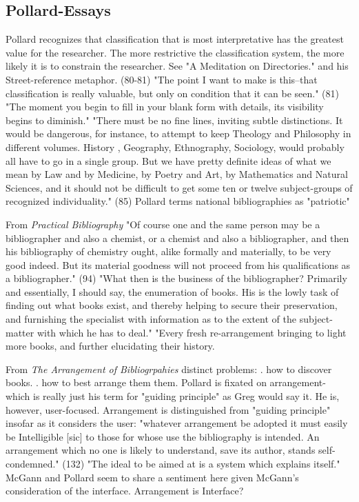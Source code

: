 \documentclass[course, english]{Notes}
\newcommand{\n}{\scalebox{2}{\textbf{\framebox{$\aleph$} } } }
\begin{document}
\subsection{Pollard-Essays}
\begin{outline}
\1 \n Pollard recognizes that classification that is most interpretative has the greatest value for the researcher. The more restrictive the classification system, the more likely it is to constrain the researcher. 
	\2 See "A Meditation on Directories." and his Street-reference metaphor. (80-81)
	\2 "The point I want to make is this--that classification is really valuable, but only on condition that it can be seen." (81)
			\3 "The moment you begin to fill in your blank form with details, its visibility begins to diminish." 
	\2 "There must be no fine lines, inviting subtle distinctions. It would be dangerous, for instance, to attempt to keep Theology and Philosophy in different volumes. History , Geography, Ethnography, Sociology, would probably all have to go in a single group. But we have pretty definite ideas of what we mean by Law and by Medicine, by Poetry and Art, by Mathematics and Natural Sciences, and it should not be difficult to get some ten or twelve subject-groups of recognized individuality." (85)
		\3 Pollard terms national bibliographies as "patriotic"
	
\1 From \textit{Practical Bibliography}
	\2 "Of course one and the same person may be a bibliographer and also a chemist, or a chemist and also a bibliographer, and then his bibliography of chemistry ought, alike formally and materially, to be very good indeed. But its material goodness will not proceed from his qualifications as a bibliographer." (94)
	\2 "What then is the business of the bibliographer? Primarily and essentially, I should say, the enumeration of books. His is the lowly task of finding out what books exist, and thereby helping to secure their preservation, and furnishing the specialist with information as to the extent of the subject-matter with which he has to deal."
		"Every fresh re-arrangement bringing to light more books, and further elucidating their history. 

\1 From \textit{The Arrangement of Bibliogrpahies}
	 distinct problems:
		. how to discover books.
		. how to best arrange them them.
	\2 Pollard is fixated on arrangement- which is really just his term for "guiding principle" as Greg would say it. 
		\3 He is, however, user-focused. Arrangement is distinguished from "guiding principle" insofar as it considers the user: "whatever arrangement be adopted it must easily be Intelligible [sic] to those for whose use the bibliography is intended. An arrangement which no one is likely to understand, save its author, stands self-condemned." (132)
			\4 "The ideal to be aimed at is a system which explains itself." 
			\4 McGann and Pollard seem to share a sentiment here given McGann's consideration of the interface. Arrangement is Interface?
				

\end{outline}
\end{document}
